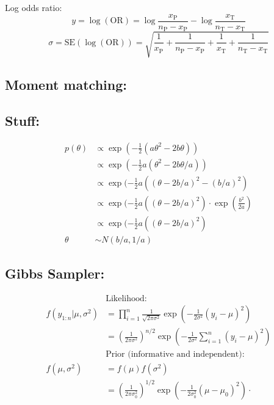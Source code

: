 \documentclass{article}\usepackage[]{graphicx}\usepackage[]{xcolor}
\begin{document}
\begin{multicols*}{2}
Log odds ratio:
\begin{equation*}
y=\log(\text{OR})=\log\frac{x_\text{P}}{n_\text{P}-x_\text{P}}-
\log\frac{x_\text{T}}{n_\text{T}-x_\text{T}}
\end{equation*}
\begin{equation*}
\sigma=\text{SE}\left(\log(\text{OR})\right)=
\sqrt{\frac{1}{x_\text{P}} +\frac{1}{n_\text{P}-x_\text{P}} + 
\frac{1}{x_\text{T}} +\frac{1}{n_\text{T}-x_\text{T}}
}
\end{equation*}

\subsection{Moment matching:}

\subsection{Stuff:}
\begin{align*}
p(\theta)&\propto \exp(-\frac{1}{2}(a\theta^2-2b\theta))\\
         &\propto \exp(-\frac{1}{2}a(\theta^2-2b\theta/a))\\
         &\propto \exp(-\frac{1}{2}a((\theta-2b/a)^2-(b/a)^2)\\
         &\propto \exp(-\frac{1}{2}a((\theta-2b/a)^2)\cdot\exp(\frac{b^2}{2a})\\
         &\propto \exp(-\frac{1}{2}a((\theta-2b/a)^2)\\
   \theta&\sim N(b/a,1/a)
\end{align*}

\subsection{Gibbs Sampler:}

\begin{align*}
&\text{Likelihood:}\\
f(y_{1:n}|\mu,\sigma^2)&=\prod_{i=1}^{n}\frac{1}{\sqrt{2\pi\sigma^2}}\exp\left(-\frac{1}{2\sigma^2}(y_i-\mu)^2\right)\\
&=\left(\frac{1}{2\pi\sigma^2}\right)^{n/2}\exp\left(-\frac{1}{2\sigma^2}\sum_{i=1}^{n}(y_i-\mu)^2\right)\\
&\text{Prior (informative and independent):}\\
f(\mu,\sigma^2)&=f(\mu)f(\sigma^2)\\
&=\left(\frac{1}{2\pi\sigma_0^2}\right)^{1/2}\exp\left(-\frac{1}{2\sigma_0^2}(\mu-\mu_0)^2\right)\cdot
\end{align*}




\end{multicols*}
\end{document}
